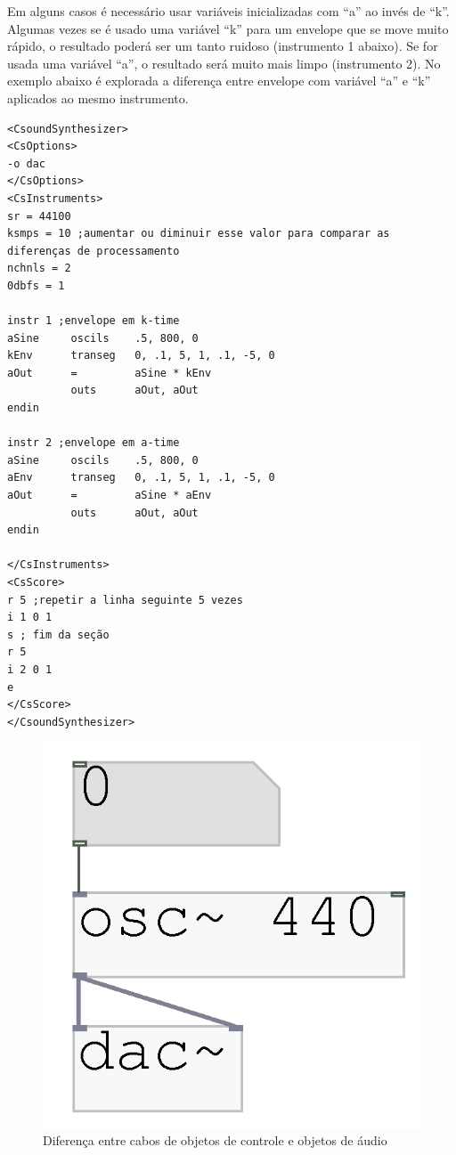 \documentclass{ppgmus}
\begin{document}
Em alguns casos é necessário usar variáveis inicializadas com ``a'' ao invés de ``k''. Algumas vezes 
se é usado uma variável ``k'' para um envelope que se move muito rápido, o resultado poderá ser
um tanto ruidoso (instrumento 1 abaixo). Se for usada uma variável ``a'', o resultado será 
muito mais limpo (instrumento 2). No exemplo abaixo é explorada a diferença
entre envelope com variável ``a'' e ``k'' aplicados ao mesmo instrumento.

\singlespacing
\footnotesize
\begin{verbatim}
<CsoundSynthesizer>
<CsOptions>
-o dac
</CsOptions>
<CsInstruments>
sr = 44100
ksmps = 10 ;aumentar ou diminuir esse valor para comparar as diferenças de processamento
nchnls = 2
0dbfs = 1

instr 1 ;envelope em k-time
aSine     oscils    .5, 800, 0
kEnv      transeg   0, .1, 5, 1, .1, -5, 0
aOut      =         aSine * kEnv
          outs      aOut, aOut
endin

instr 2 ;envelope em a-time
aSine     oscils    .5, 800, 0
aEnv      transeg   0, .1, 5, 1, .1, -5, 0
aOut      =         aSine * aEnv
          outs      aOut, aOut
endin

</CsInstruments>
<CsScore>
r 5 ;repetir a linha seguinte 5 vezes
i 1 0 1
s ; fim da seção
r 5 
i 2 0 1
e
</CsScore>
</CsoundSynthesizer>
\end{verbatim} 
\normalsize
\doublespacing

\begin{figure}
\includegraphics[scale=.6]{cabos}
\caption{Diferença entre cabos de objetos de controle e objetos de áudio}
\label{cabos}
\end{figure}
\end{document}
